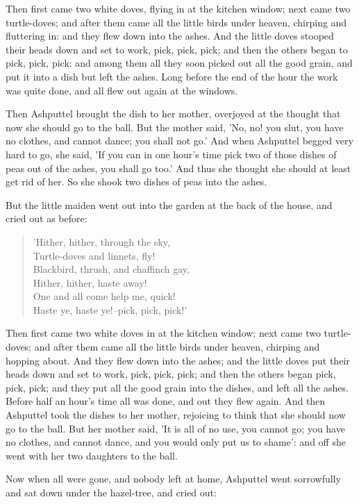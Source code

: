 \documentclass[12pt]{book}
\begin{document}
Then first came two white doves, flying in at the kitchen window; next
came two turtle-doves; and after them came all the little birds under
heaven, chirping and fluttering in: and they flew down into the ashes.
And the little doves stooped their heads down and set to work, pick,
pick, pick; and then the others began to pick, pick, pick: and among
them all they soon picked out all the good grain, and put it into a
dish but left the ashes. Long before the end of the hour the work was
quite done, and all flew out again at the windows.

Then Ashputtel brought the dish to her mother, overjoyed at the
thought that now she should go to the ball. But the mother said, 'No,
no! you slut, you have no clothes, and cannot dance; you shall not
go.' And when Ashputtel begged very hard to go, she said, 'If you can
in one hour's time pick two of those dishes of peas out of the ashes,
you shall go too.' And thus she thought she should at least get rid of
her. So she shook two dishes of peas into the ashes.

But the little maiden went out into the garden at the back of the
house, and cried out as before:

\begin{verse}
 'Hither, hither, through the sky,\\
  Turtle-doves and linnets, fly!\\
  Blackbird, thrush, and chaffinch gay,\\
  Hither, hither, haste away!\\
  One and all come help me, quick!\\
  Haste ye, haste ye!--pick, pick, pick!'
\end{verse}

Then first came two white doves in at the kitchen window; next came
two turtle-doves; and after them came all the little birds under
heaven, chirping and hopping about. And they flew down into the ashes;
and the little doves put their heads down and set to work, pick, pick,
pick; and then the others began pick, pick, pick; and they put all the
good grain into the dishes, and left all the ashes. Before half an
hour's time all was done, and out they flew again. And then Ashputtel
took the dishes to her mother, rejoicing to think that she should now
go to the ball. But her mother said, 'It is all of no use, you cannot
go; you have no clothes, and cannot dance, and you would only put us
to shame': and off she went with her two daughters to the ball.

Now when all were gone, and nobody left at home, Ashputtel went
sorrowfully and sat down under the hazel-tree, and cried out:
\end{document}

